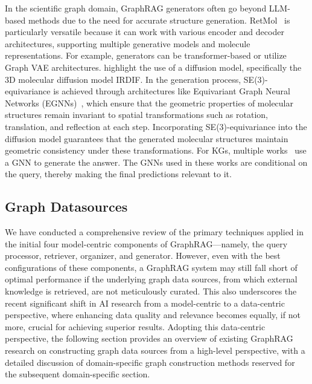 In the scientific graph domain, GraphRAG generators often go beyond LLM-based methods due to the need for accurate structure generation. RetMol~\cite{wangretrieval} is particularly versatile because it can work with various encoder and decoder architectures, supporting multiple generative models and molecule representations. For example, generators can be transformer-based or utilize Graph VAE architectures. \citet{huanginteraction} highlight the use of a diffusion model, specifically the 3D molecular diffusion model IRDIF. In the generation process, SE(3)-equivariance is achieved through architectures like Equivariant Graph Neural Networks (EGNNs)~\cite{satorras2021n}, which ensure that the geometric properties of molecular structures remain invariant to spatial transformations such as rotation, translation, and reflection at each step. Incorporating SE(3)-equivariance into the diffusion model guarantees that the generated molecular structures maintain geometric consistency under these transformations. For KGs, multiple works~\cite{feng2020scalable, yasunaga2021qa, taunk2023grapeqa} use a GNN to generate the answer. The GNNs used in these works are conditional on the query, thereby making the final predictions relevant to it.



\subsection{Graph Datasources}
We have conducted a comprehensive review of the primary techniques applied in the initial four model-centric components of GraphRAG—namely, the query processor, retriever, organizer, and generator. However, even with the best configurations of these components, a GraphRAG system may still fall short of optimal performance if the underlying graph data sources, from which external knowledge is retrieved, are not meticulously curated. This also underscores the recent significant shift in AI research from a model-centric to a data-centric perspective, where enhancing data quality and relevance becomes equally, if not more, crucial for achieving superior results. Adopting this data-centric perspective, the following section provides an overview of existing GraphRAG research on constructing graph data sources from a high-level perspective, with a detailed discussion of domain-specific graph construction methods reserved for the subsequent domain-specific section.



